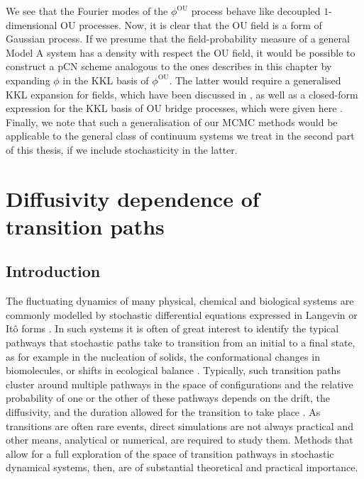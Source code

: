 We see that the Fourier modes of the $\phi^\text{OU}$ process behave like decoupled $1$-dimensional OU processes. Now, it is clear that the OU field is a form of Gaussian process. If we presume that the field-probability measure of a general Model A system has a density with respect the OU field, it would be possible to construct a pCN scheme analogous to the ones describes in this chapter by expanding $\phi$ in the KKL basis of $\phi^\text{OU}$. The latter would require a generalised KKL expansion for fields, which have been discussed in \citep{wangKarhunenLoeveExpansionsTheir2008}, as well as a closed-form expression for the KKL basis of OU bridge processes, which were given here \citep{corlayPropertiesOrnsteinUhlenbeckBridge2014a}. Finally, we note that such a generalisation of our MCMC methods would be applicable to the general class of continuum systems we treat in the second part of this thesis, if we include stochasticity in the latter.



\chapter{Diffusivity dependence of transition paths} \label{ch:Diffusivity dependence of transition paths}

\section{Introduction}


The fluctuating dynamics of many physical, chemical and biological
systems are commonly modelled by stochastic differential equations
expressed in Langevin or Itô forms \citep{kampenStochasticProcessesPhysics2011a, gardinerStochasticMethodsHandbook2010a, riskenFokkerPlanckEquationMethods2012a, bharucha-reidElementsTheoryMarkov2012a}.
In such systems it is often of great interest to identify the typical
pathways that stochastic paths take to transition from an initial
to a final state, as for example in the nucleation of solids, the
conformational changes in biomolecules, or shifts in ecological balance
\citep{faccioliDominantPathwaysProtein2006a, demarcoPhaseTransitionModel2001a, gardnerConstructionGeneticToggle2000a, mangelBarrierTransitionsDriven1994a, wolynesNavigatingFoldingRoutes1995a, huangMolecularMathematicalBasis2012a, paninskiMostLikelyVoltage2006a, noltingBallsCupsQuasipotentials2016a, leeFindingMultipleReaction2017a}.
Typically, such transition paths cluster around multiple pathways
in the space of configurations and the relative probability of one
or the other of these pathways depends on the drift, the diffusivity,
and the duration allowed for the transition to take place \citep{onsagerFluctuationsIrreversibleProcesses1953a, bachFunctionalsPathsDiffusion1977a, itoProbabilisticConstructionLagrangean1978b, ikedaStochasticDifferentialEquations2014a}.
As transitions are often rare events, direct simulations are not always
practical and other means, analytical or numerical, are required to
study them. Methods that allow for a full exploration of the space
of transition pathways in stochastic dynamical systems, then, are
of substantial theoretical and practical importance.

